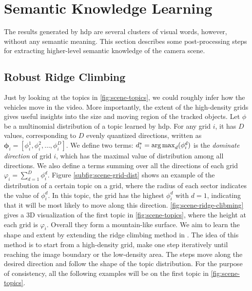 \section{Semantic Knowledge Learning}
\label{sec:scene-ridge-climbing}
The results generated by \gls{hdp} are several clusters of visual words, however, without any semantic meaning.
This section describes some post-processing steps for extracting higher-level semantic knowledge of the camera scene.

\subsection{Robust Ridge Climbing}
    Just by looking at the topics in \ref{fig:scene-topics}, we could roughly infer how the vehicles move in the video. 
    More importantly, the extent of the high-density grids gives useful insights into the size and moving region of the tracked objects. 
    Let $\phi$ be a multinomial distribution of a topic learned by \gls{hdp}. For any grid $i$, it has $D$ values, corresponding to $D$ evenly quantized directions, written as $\bm{\phi}_i= [\phi_i^{1}, \phi_i^{2}, \dots, \phi_i^{D}]$.
    We define two terms:
    $d^*_i = \operatorname*{arg\,max}_{d}(\phi_i^{d})$ is the \emph{dominate direction} of grid $i$, which has the maximal value of distribution among all directions.
    We also define a terms summing over all the directions of each grid $\varphi_{i} = \sum_{d=1}^{D}{\phi_i^{d}}$.
    Figure \ref{subfig:scene-grid-dist} shows an example of the distribution of a certain topic on a grid, where the radius of each sector indicates the value of $\phi_i^{d}$. 
    In this topic, the grid has the highest $\phi_i^d$ with $d=1$, indicating that it will be most likely to move along this direction. 
    \ref{fig:scene-ridge-clibming} gives a 3D visualization of the first topic in \ref{fig:scene-topics}, where the height at each grid is $\varphi_{i}$. 
    Overall they form a mountain-like surface. We aim to learn the shape and extent by extending the ridge climbing method in \cite{zhao2013counting}. 
    The idea of this method is to start from a high-density grid, make one step iteratively until reaching the image boundary or the low-density area. 
    The steps move along the desired direction and follow the shape of the topic distribution. 
    For the purpose of consistency, all the following examples will be on the first topic in \ref{fig:scene-topics}.
    
    

